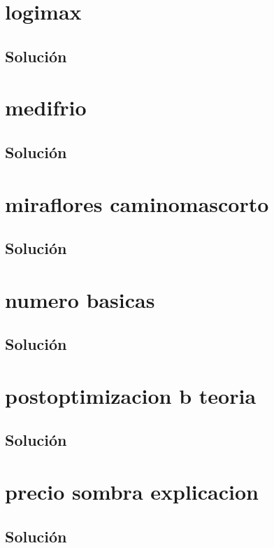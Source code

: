 \documentclass[a4paper,10pt,onecolumn]{report}
\begin{document}
\section{logimax}

\subsection*{Solución}

\clearpage
\section{medifrio}

\subsection*{Solución}

\clearpage
\section{miraflores caminomascorto}

\subsection*{Solución}

\clearpage
\section{numero basicas}

\subsection*{Solución}

\clearpage
\section{postoptimizacion b teoria}

\subsection*{Solución}

\clearpage
\section{precio sombra explicacion}

\subsection*{Solución}

\clearpage
\end{document}
